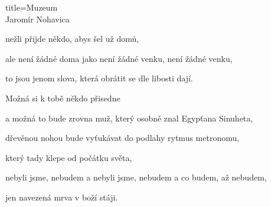 \begin{song}{title=\centering Muzeum \\\normalsize Jaromír Nohavica  \vspace*{-0.3cm}}
{	nežli přijde někdo, abys šel už domů,
	
	ale není žádné doma jako není žádné venku, není žádné venku,
	
	to jsou jenom slova, která obrátit se dle libosti dají.


\sloka
	Možná si k tobě někdo přisedne
	
	a možná to bude zrovna muž, který osobně znal Egypťana Sinuheta,
	
	dřevěnou nohou bude vyťukávat do podlahy rytmus metronomu,
	
	který tady klepe od počátku světa,
	
	nebyli jsme, nebudem a nebyli jsme, nebudem a co budem, až nebudem,
	
	jen navezená mrva v boží stáji.
	
	

}
\setcounter{Slokočet}{0}
\end{song}

